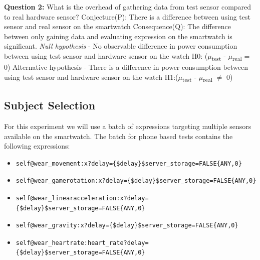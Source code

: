     \textbf{Question 2:}  What is the overhead of gathering data from test sensor compared to real hardware sensor?\newline
    Conjecture(P): There is  a difference between using test sensor and real sensor on the smartwatch\newline
    Consequence(Q): The difference between only gaining data and evaluating expression on the smartwatch is significant.\newline
    \textit{Null hypothesis} - No observable difference in power consumption between using test sensor and hardware sensor on the watch\newline
H0: ($\mu$\textsubscript{test} - $\mu$\textsubscript{real} = 0)\newline
    Alternative hypothesis - There is a difference in power consumption between using test sensor and hardware sensor on the watch\newline
H1:($\mu$\textsubscript{test} - $\mu$\textsubscript{real} $\neq$ 0)\newline

\subsection{Subject Selection}
For this experiment we will use a batch of expressions targeting multiple sensors available on the smartwatch.
The batch for phone based tests contains the following expressions:
\begin{itemize}
 \item \begin{verbatim}self@wear_movement:x?delay={$delay}$server_storage=FALSE{ANY,0}\end{verbatim}
 \item \begin{verbatim}self@wear_gamerotation:x?delay={$delay}$server_storage=FALSE{ANY,0}\end{verbatim}
 \item \begin{verbatim}self@wear_linearacceleration:x?delay={$delay}$server_storage=FALSE{ANY,0}\end{verbatim}
 \item \begin{verbatim}self@wear_gravity:x?delay={$delay}$server_storage=FALSE{ANY,0}\end{verbatim}
 \item \begin{verbatim}self@wear_heartrate:heart_rate?delay={$delay}$server_storage=FALSE{ANY,0}\end{verbatim}
\end{itemize}

